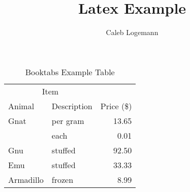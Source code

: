 \documentclass[12pt, oneside]{article}
\title{Latex Example}
\author{Caleb Logemann}
\begin{document}

    \begin{table}
        \centering
        \begin{tabular}{llr}
            \toprule

            \multicolumn{2}{c}{Item} \\

            \cmidrule(r){1-2}

            Animal    & Description & Price (\$) \\
            \midrule
            Gnat      & per gram    & 13.65      \\
                      & each        & 0.01       \\
            Gnu       & stuffed     & 92.50      \\
            Emu       & stuffed     & 33.33      \\
            Armadillo & frozen      & 8.99       \\

            \bottomrule
        \end{tabular}

        \caption{Booktabs Example Table}

        \label{tab:exampleTable}
    \end{table}
\end{document}

